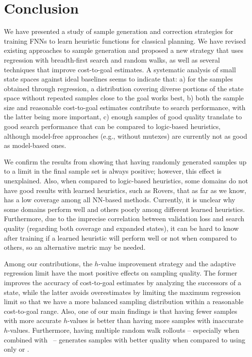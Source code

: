 \chapter{Conclusion}
\label{sec:conclusion}

We have presented a study of sample generation and correction strategies for training FNNs to learn heuristic functions for classical planning. We have revised existing approaches to sample generation and proposed a new strategy that uses regression with breadth-first search and random walks, as well as several techniques that improve cost-to-goal estimates. A systematic analysis of small state spaces against ideal baselines seems to indicate that: a) for the samples obtained through regression, a distribution covering diverse portions of the state space without repeated samples close to the goal works best, b) both the sample size and reasonable cost-to-goal estimates contribute to search performance, with the latter being more important, c) enough samples of good quality translate to good search performance that can be compared to logic-based heuristics, although model-free approaches (e.g., without mutexes) are currently not as good as model-based ones.

We confirm the results from \citeyear{OToole/2022} showing that having randomly generated samples up to a limit in the final sample set is always positive; however, this effect is unexplained. Also, when compared to logic-based heuristics, some domains do not have good results with learned heuristics, such as Rovers, that as far as we know, has a low coverage among all NN-based methods. Currently, it is unclear why some domains perform well and others poorly among different learned heuristics. Furthermore, due to the imprecise correlation between validation loss and search quality (regarding both coverage and expanded states), it can be hard to know after training if a learned heuristic will perform well or not when compared to others, so an alternative metric may be needed.

Among our contributions, the $h$-value improvement strategy \hvfc and the adaptive regression limit \meanfx have the most positive effects on sampling quality. The former improves the accuracy of cost-to-goal estimates by analyzing the successors of a state, while the latter avoids overestimates by limiting the maximum regression limit so that we have a more balanced sampling distribution within a reasonable cost-to-goal range. Also, one of our main findings is that having fewer samples with more accurate $h$-values is better than having more samples with inaccurate $h$-values.
Furthermore, having multiple random walk rollouts -- especially when combined with \bfs~-- generates samples with better quality when compared to using only \bfs or \dfs.
